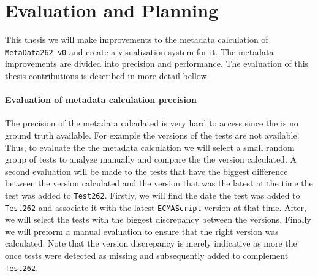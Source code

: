 \documentclass[runningheads]{llncs}
\begin{document}
\section{Evaluation and Planning}
\label{sec:Evaluation and Planning}





This thesis we will make improvements to the metadata calculation of \texttt{MetaData262 v0} and create a visualization system for it. The metadata improvements are divided into precision and performance. The evaluation of this thesis contributions is described in more detail bellow.

\paragraph{Evaluation of metadata calculation precision}
The precision of the metadata calculated is very hard to access since the is no ground truth available. For example the versions of the tests are not available. Thus, to evaluate the the metadata calculation we will select a small random group of tests to analyze manually and compare the the version calculated. A second evaluation will be made to the tests that have the biggest difference between the version calculated and the version that was the latest at the time the test was added to \texttt{Test262}. Firstly, we will find the date the test was added to \texttt{Test262} and associate it with the latest \texttt{ECMAScript} version at that time. After, we will select the tests with the biggest discrepancy between the versions. Finally we will preform a manual evaluation to ensure that the right version was calculated. Note that the version discrepancy is merely indicative as more the once tests were detected as missing and subsequently added to complement \texttt{Test262}.
\end{document}
